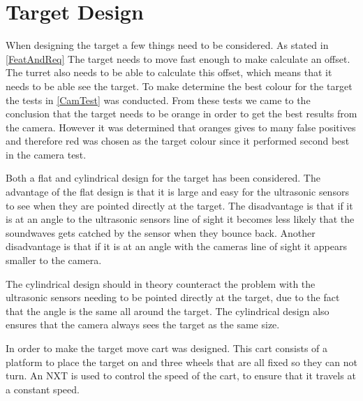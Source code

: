 \section{Target Design}
When designing the target a few things need to be considered. As stated in
\autoref{FeatAndReq} The target needs to move fast enough to make \name
calculate an offset. The turret also needs to be able to calculate this offset,
which means that it needs to be able see the target. To make determine the
best colour for the target the tests in \autoref{CamTest} was conducted. From
these tests we came to the conclusion that the target needs to be orange in
order to get the best results from the camera.
However it was determined that oranges gives to many false positives and
therefore red was chosen as the target colour since it performed second best in
the camera test.\nl

Both a flat and cylindrical design for the target has been considered. The
advantage of the flat design is that it is large and easy for the ultrasonic
sensors to see when they are pointed directly at the target. The disadvantage
is that if it is at an angle to the ultrasonic sensors line of sight it 
becomes less likely that the soundwaves gets catched by the sensor when they
bounce back. Another disadvantage is that if it is at an angle with the
cameras line of sight it appears smaller to the camera.\nl

The cylindrical design should in theory counteract the problem with the
ultrasonic sensors needing to be pointed directly at the target, due to the
fact that the angle is the same all around the target. The cylindrical design
also ensures that the camera always sees the target as the same size.\nl

In order to make the target move cart was designed. This cart consists of a
platform to place the target on and three wheels that are all fixed so they can
not turn. An NXT is used to control the speed of the cart, to ensure that it
travels at a constant speed.



